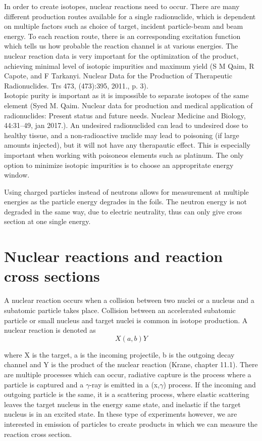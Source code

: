 \documentclass[a4paper,11pt,twoside]{book}
\begin{document}
In order to create isotopes, nuclear reactions need to occur. There are many different production routes available for a single radionuclide, which is dependent on multiple factors such as choice of target, incident particle-beam and beam energy. To each reaction route, there is an corresponding excitation function which tells us how probable the reaction channel is at various energies. The nuclear reaction data is very important for the optimization of the product, achieving minimal level of isotopic impurities and maximum yield (S M Qaim, R Capote, and F Tarkanyi. Nuclear Data for the Production of Therapeutic Radionuclides.
Trs 473, (473):395, 2011., p. 3). \\

Isotopic purity is important as it is impossible to separate isotopes of the same element (Syed M. Qaim. Nuclear data for production and medical application of radionuclides:
Present status and future needs. Nuclear Medicine and Biology, 44:31–49, jan 2017.). An undesired radionuclided can lead to undesired dose to healthy tissue, and a non-radioactive nuclide may lead to  poisoning (if large amounts injected), but it will not have any therapautic effect. This is especially important when working with poisoneos elements such as platinum. The only option to minimize isotopic impurities is to choose an appropritate energy window. 


Using charged particles instead of neutrons allows for measurement at multiple energies as the particle energy degrades in the foils. The neutron energy is not degraded in the same way, due to electric neutrality, thus can only give cross section at one single energy. 





\section{Nuclear reactions and reaction cross sections}

A nuclear reaction occurs when a collision between two nuclei or a nucleus and a subatomic particle takes place. Collision between an accelerated subatomic particle or small nucleus and target nuclei is common in isotope production. A nuclear reaction is denoted as
\begin{equation}
    X(a,b)Y
\end{equation}

\noindent where X is the target, a is the incoming projectile, b is the outgoing decay channel and Y is the product of the nuclear reaction (Krane, chapter 11.1). There are multiple processes which can occur, radiative capture is the process where a particle is captured and a $\gamma$-ray is emitted in a (x,$\gamma$) process. If the incoming and outgoing particle is the same, it is a scattering process, where elastic scattering leaves the target nucleus in the energy same state, and inelastic if the target nucleus is in an excited state. In these type of experiments however, we are interested in emission of particles to create products in which we can measure the reaction cross section. \\
\end{document}

